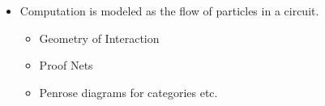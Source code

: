 \documentclass[svgnames,11pt]{beamer}
\begin{document}
\begin{frame}
    \begin{itemize}
    \item Computation is modeled as the flow of particles in a
      circuit.

      \begin{itemize}
      \item Geometry of Interaction
      \item Proof Nets 
      \item Penrose diagrams for categories etc.
      \end{itemize}
    \end{itemize}

\vfill

\end{frame}
\end{document}
